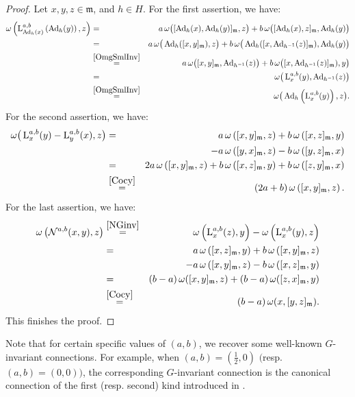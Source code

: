 \documentclass[preprint,12pt,1p]{elsarticle}
\theoremstyle{plain}
\theoremstyle{definition}
\newcommand{\w}{\omega}
\newcommand{\m}{\mathfrak{m}}
\newcommand{\Ad}{\operatorname{Ad}}
\numberwithin{equation}{section}
\newcommand{\lab}{\operatorname{L}^{a,b}}
\newcommand{\ab}{(a,b)}
\begin{document}
\begin{proof}
Let $x,y,z\in\mathfrak{m}$, and $h\in H$. For the first assertion, we have:
\begin{eqnarray*}
\omega\left(\lab_{\Ad_h(x)}\left(\Ad_h(y)\right),z\right)&=&a\,\omega\big([\Ad_h(x),\Ad_h(y)]_\mathfrak{m},z\big)+b\,\omega\big([\Ad_h(x),z]_\mathfrak{m},\Ad_h(y)\big)\\
&=&a\,\omega\big(\Ad_h([x,y]_\mathfrak{m}),z\big)+b\,\omega\big(\Ad_h([x,\Ad_{h^{-1}}(z)]_\mathfrak{m}),\Ad_h(y)\big)\\
&\stackrel{\rm\eqref{OmgSmlInv}}{=}&a\,\omega\big([x,y]_\mathfrak{m},\Ad_{h^{-1}}(z)\big)+b\,\omega\big([x,\Ad_{h^{-1}}(z)]_\mathfrak{m}),y\big)\\
&=&\omega\big(\lab_x(y),\Ad_{h^{-1}}(z)\big)\\
&\stackrel{\rm\eqref{OmgSmlInv}}{=}&\omega\big(\Ad_{h}\left(\lab_x(y)\right),z\big).
\end{eqnarray*}
For the second assertion, we have:
\begin{eqnarray*}
\omega\big(\lab_x(y)-\lab_y(x),z\big)&=&a\,\omega\left([x,y]_\mathfrak{m},z\right)+b\,\omega\left([x,z]_\mathfrak{m},y\right)\\
&&-a\,\omega\left([y,x]_\mathfrak{m},z\right)-b\,\omega\left([y,z]_\mathfrak{m},x\right)\\
&=&2a\,\omega\left([x,y]_\mathfrak{m},z\right)+b\,\omega\left([x,z]_\mathfrak{m},y\right)+b\,\omega\left([z,y]_\mathfrak{m},x\right)\\
&\stackrel{\rm\eqref{Cocy}}{=}&(2a+b)\,\omega\left([x,y]_\mathfrak{m},z\right).
\end{eqnarray*}
For the last assertion, we have:
\begin{eqnarray*}
\omega\left(\mathcal{N}^{a,b}(x,y),z\right)&\stackrel{\rm\eqref{NGinv}}{=}&\omega\left(\lab_x(z),y\right)-\omega\left(\lab_x(y),z\right)\\
&=&a\,\omega\left([x,z]_\mathfrak{m},y\right)+b\,\omega\left([x,y]_\mathfrak{m},z\right)\\
&&-a\,\omega\left([x,y]_\mathfrak{m},z\right)-b\,\omega\left([x,z]_\mathfrak{m},y\right)\\
&=&(b-a)\,\w([x,y]_\m,z)+(b-a)\,\w([z,x]_\m,y)\\
&\stackrel{\rm\eqref{Cocy}}{=}&(b-a)\,\w(x,[y,z]_\m).
\end{eqnarray*}
This finishes the proof.
\end{proof}

Note that for certain specific values of $\ab$, we recover some well-known $G$-invariant connections. For example, when $\ab=(\tfrac{1}{2},0)$ $\big($resp. $\ab=(0,0)\big)$, the corresponding $G$-invariant connection is the canonical connection of the first (resp. second) kind introduced in \cite{Nom1}.\\
\end{document}
